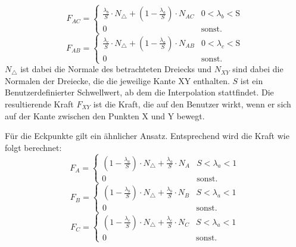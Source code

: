 \documentclass[conference]{IEEEtran}
\begin{document}
\begin{equation}
    F_{AC} = 
    \begin{cases} 
        \frac{\lambda_b}{S}\cdot N_{\triangle} + (1-\frac{\lambda_a}{S})\cdot N_{AC} &  0 < \lambda_b < \text{S} \\
        0 & \text{sonst.}
    \end{cases}
\end{equation}
\begin{equation*}
    F_{AB} = 
    \begin{cases} 
        \frac{\lambda_c}{S}\cdot N_{\triangle} + (1-\frac{\lambda_a}{S})\cdot N_{AB} &  0 < \lambda_c < \text{S} \\
        0 & \text{sonst.}
    \end{cases}
\end{equation*}
$N_{\triangle}$ ist dabei die Normale des betrachteten Dreiecks und $N_{XY}$ sind dabei die Normalen der Dreiecke, die die jeweilige Kante XY enthalten. $S$ ist ein Benutzerdefinierter Schwellwert, ab dem die Interpolation stattfindet. Die resultierende Kraft $F_{XY}$ ist die Kraft, die auf den Benutzer wirkt, wenn er sich auf der Kante zwischen den Punkten X und Y bewegt.

Für die Eckpunkte gilt ein ähnlicher Ansatz. Entsprechend wird die Kraft wie folgt berechnet:
\begin{equation*}
    F_{A} = 
    \begin{cases} 
        (1-\frac{\lambda_a}{S})\cdot N_{\triangle} + \frac{\lambda_a}{S}\cdot N_{A} &  S < \lambda_a < 1 \\
        0 & \text{sonst.}
    \end{cases}
\end{equation*} 
\begin{equation}
    F_{B} = 
    \begin{cases} 
        (1-\frac{\lambda_b}{S})\cdot N_{\triangle} + \frac{\lambda_b}{S}\cdot N_{B} &  S < \lambda_a < 1 \\
        0 & \text{sonst.}
    \end{cases}
\end{equation} 
\begin{equation*}
    F_{C} = 
    \begin{cases} 
        (1-\frac{\lambda_c}{S})\cdot N_{\triangle} + \frac{\lambda_c}{S}\cdot N_{C} &  S < \lambda_a < 1 \\
        0 & \text{sonst.}
    \end{cases}
\end{equation*} 
\end{document}
